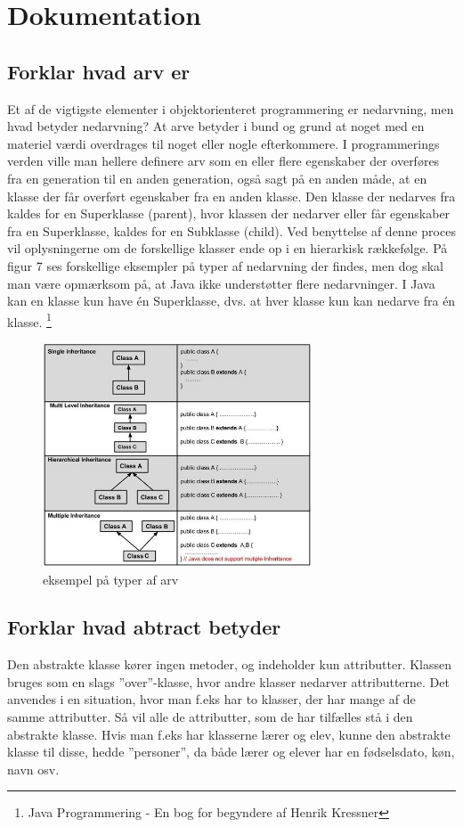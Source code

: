 \section{Dokumentation}
\subsection{Forklar hvad arv er}

Et af de vigtigste elementer i objektorienteret programmering er nedarvning, men hvad betyder nedarvning? At arve betyder i bund og grund at noget med en materiel værdi overdrages til noget eller nogle efterkommere. I programmerings verden ville man hellere definere arv som en eller flere egenskaber der overføres fra en generation til en anden generation, også sagt på en anden måde, at en klasse der får overført egenskaber fra en anden klasse. Den klasse der nedarves fra kaldes for en Superklasse (parent), hvor klassen der nedarver eller får egenskaber fra en Superklasse, kaldes for en Subklasse (child).
Ved benyttelse af denne proces vil oplysningerne om de forskellige klasser ende op i en hierarkisk rækkefølge. 
På figur 7 ses forskellige eksempler på typer af nedarvning der findes, men dog skal man være opmærksom på, at Java ikke understøtter flere nedarvninger. I Java kan en klasse kun have én Superklasse, dvs. at hver klasse kun kan nedarve fra én klasse. \footnote{ Java Programmering - En bog for begyndere af Henrik Kressner}

\begin{figure}[h]\label{fig:types_of_inheritance.jpg} 
    \includegraphics[width=8cm]{fig/types_of_inheritance.jpg}
    \caption{eksempel på typer af arv}
\end{figure}
\subsection{Forklar hvad abtract betyder}
Den abstrakte klasse kører ingen metoder, og indeholder kun attributter. Klassen bruges som en slags ”over”-klasse, hvor andre klasser nedarver attributterne. Det anvendes i en situation, hvor man f.eks har to klasser, der har mange af de samme attributter. Så vil alle de attributter, som de har tilfælles stå i den abstrakte klasse.
Hvis man f.eks har klasserne lærer og elev, kunne den abstrakte klasse til disse, hedde ”personer”, da både lærer og elever har en fødselsdato, køn, navn osv.


